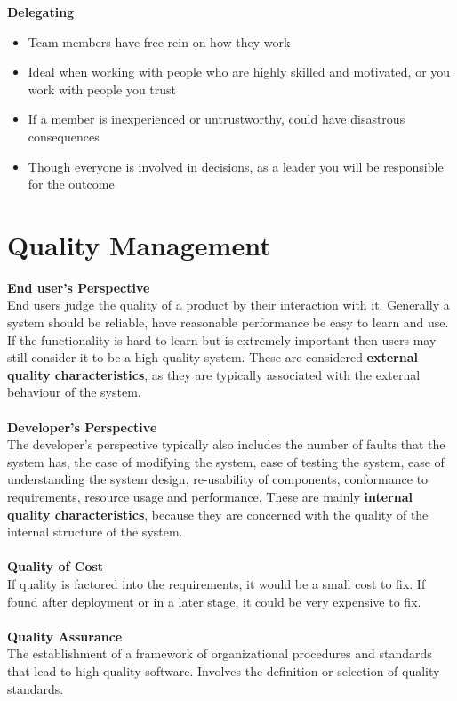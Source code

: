\documentclass[a4paper,10pt]{article}
\begin{document}
\textbf{Delegating}
\begin{itemize}
	\item Team members have free rein on how they work 
	\item Ideal when working with people who are highly skilled and motivated, or you work with people you trust 
	\item If a member is inexperienced or untrustworthy, could have disastrous consequences
	\item Though everyone is involved in decisions, as a leader you will be responsible for the outcome
\end{itemize}
\newpage
\section*{Quality Management}
\textcolor{BlueGreen}{\textbf{End user's Perspective}} \\
End users judge the quality of a product by their interaction with it. Generally a system should be reliable, have reasonable performance be easy to learn and use. If the functionality is hard to learn but is extremely important then users may still consider it to be a high quality system. These are considered \textbf{external quality characteristics}, as they are typically associated with the external behaviour of the system. \\\\
\textcolor{BlueGreen}{\textbf{Developer's Perspective}} \\
The developer's perspective typically also includes the number of faults that the system has, the ease of modifying the system, ease of testing the system, ease of understanding the system design, re-usability of components, conformance to requirements, resource usage and performance. These are mainly \textbf{internal quality characteristics}, because they are concerned with the quality of the internal structure of the system. \\\\
\textcolor{BlueGreen}{\textbf{Quality of Cost}} \\ 
If quality is factored into the requirements, it would be a small cost to fix. If found after deployment or in a later stage, it could be very expensive to fix. \\\\
\textcolor{BlueGreen}{\textbf{Quality Assurance}} \\ 
The establishment of a framework of organizational procedures and standards that lead to high-quality software. Involves the definition or selection of  quality standards.\\\\
\end{document}
